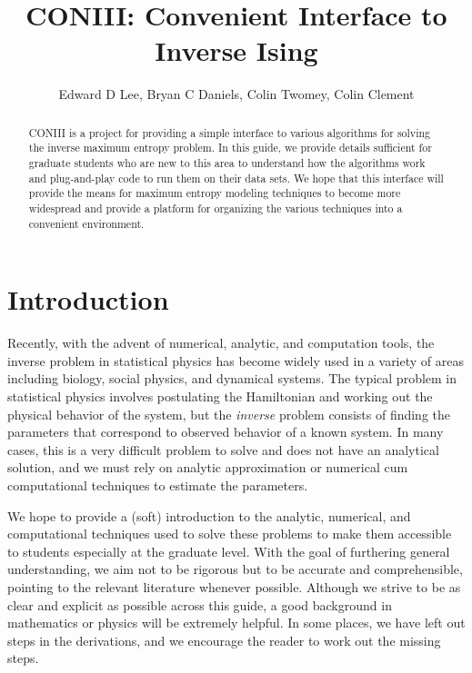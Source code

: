 \documentclass[11pt]{amsart}
\title{CONIII: Convenient Interface to Inverse Ising}
\author{Edward D Lee, Bryan C Daniels, Colin Twomey, Colin Clement}
\begin{document}
\begin{abstract}
CONIII is a project for providing a simple interface to various algorithms for solving the inverse maximum entropy problem. In this guide, we provide details sufficient for graduate students who are new to this area to understand how the algorithms work and plug-and-play code to run them on their data sets. We hope that this interface will provide the means for maximum entropy modeling techniques to become more widespread and provide a platform for organizing the various techniques into a convenient environment.
\end{abstract}

\maketitle

\section{Introduction}
Recently, with the advent of numerical, analytic, and computation tools, the inverse problem in statistical physics has become widely used in a variety of areas including biology, social physics, and dynamical systems. The typical problem in statistical physics involves postulating the Hamiltonian and working out the physical behavior of the system, but the \textit{inverse} problem consists of finding the parameters that correspond to observed behavior of a known system. In many cases, this is a very difficult problem to solve and does not have an analytical solution, and we must rely on analytic approximation or numerical cum computational techniques to estimate the parameters.

We hope to provide a (soft) introduction to the analytic, numerical, and computational techniques used to solve these problems to make them accessible to students especially at the graduate level. With the goal of furthering general understanding, we aim not to be rigorous but to be accurate and comprehensible, pointing to the relevant literature whenever possible. Although we strive to be as clear and explicit as possible across this guide, a good background in mathematics or physics will be extremely helpful. In some places, we have left out steps in the derivations, and we encourage the reader to work out the missing steps.
\end{document}
